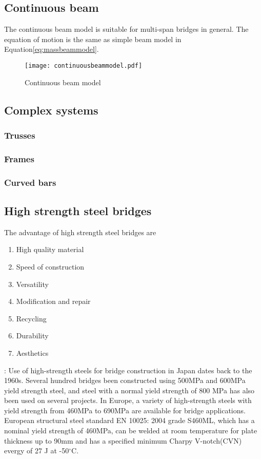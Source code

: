 \subsection{Continuous beam}
The continuous beam model is suitable for multi-span bridges in general. The equation of motion is the same as simple beam model in Equation\ref{eq:massbeammodel}. 

\begin{figure}[h]
	\centering
	\texttt{[image: continuousbeammodel.pdf]}
	\caption{Continuous beam model}
	\label{fig:continuousbeammodel}
\end{figure}
	
\subsection{Complex systems}

\subsubsection{Trusses}

\subsubsection{Frames}

\subsubsection{Curved bars}

\subsection{High strength steel bridges}
The advantage of high strength steel bridges are

\begin{enumerate}
	\item High quality material
	\item Speed of construction
	\item Versatility
	\item Modification and repair
	\item Recycling
	\item Durability
	\item Aesthetics
\end{enumerate}

\cite{macdougall2004state}: Use of high-strength steels for bridge construction in Japan dates back to the 1960s. Several hundred bridges been constructed using 500MPa and 600MPa yield strength steel, and steel with a normal yield strength of 800 MPa has also been used on several projects. In Europe, a variety of high-strength steels with yield strength from 460MPa to 690MPa are available for bridge applications. European structural steel standard EN 10025: 2004 grade S460ML, which has a nominal yield strength of 460MPa, can be welded at room temperature for plate thickness up to 90mm and has a specified minimum Charpy V-notch(CVN) evergy of 27 J at -50$^\circ$C.

